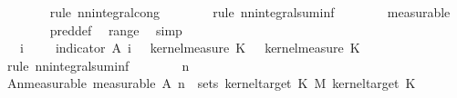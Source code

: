 \begin{isabellebody}
\ \ \ \ \ \ \isamarkupfalse%
\ {\isacharparenleft}{\kern0pt}rule\ nn{\isacharunderscore}{\kern0pt}integral{\isacharunderscore}{\kern0pt}cong{\isacharparenright}{\kern0pt}\isanewline
\ \ \ \ \ \ \isamarkupfalse%
\ {\isacharparenleft}{\kern0pt}rule\ nn{\isacharunderscore}{\kern0pt}integral{\isacharunderscore}{\kern0pt}suminf{\isacharparenright}{\kern0pt}\isanewline
\ \ \ \ \ \ \isamarkupfalse%
\ measurable\isanewline
\ \ \ \ \ \ \isamarkupfalse%
\ pred{\isacharunderscore}{\kern0pt}def\ \isamarkupfalse%
\ range\ \isamarkupfalse%
\ simp\isanewline
\ \ \ \ \ \ \isamarkupfalse%
\isanewline
\ \ \ \ \isamarkupfalse%
\ \isamarkupfalse%
\ {\isachardoublequoteopen}{\isachardot}{\kern0pt}{\isachardot}{\kern0pt}{\isachardot}{\kern0pt}\ {\isacharequal}{\kern0pt}\ {\isacharparenleft}{\kern0pt}{\isasymSum}i{\isachardot}{\kern0pt}\ {\isasymintegral}\isactrlsup {\isacharplus}{\kern0pt}\ {\isasymomega}\ {\isasymintegral}\isactrlsup {\isacharplus}{\kern0pt}\ {\isasymomega}\ indicator\ {\isacharparenleft}{\kern0pt}A\ i{\isacharparenright}{\kern0pt}\ {\isacharparenleft}{\kern0pt}{\isasymomega}\ {\isasymomega}\ {\isasympartial}kernel{\isacharunderscore}{\kern0pt}measure\ K{\isacharunderscore}{\kern0pt}{}\ {\isacharparenleft}{\kern0pt}{\isasymomega}\ {\isasymomega}\ {\isasympartial}kernel{\isacharunderscore}{\kern0pt}measure\ K{\isacharunderscore}{\kern0pt}{}\ {\isasymomega}\isanewline
\ \ \ \ \isamarkupfalse%
\ {\isacharparenleft}{\kern0pt}rule\ nn{\isacharunderscore}{\kern0pt}integral{\isacharunderscore}{\kern0pt}suminf{\isacharparenright}{\kern0pt}\isanewline
\ \ \ \ \ \ \isamarkupfalse%
\ n\isanewline
\ \ \ \ \ \ \isamarkupfalse%
\ A{\isacharunderscore}{\kern0pt}n{\isacharunderscore}{\kern0pt}measurable\ {\isacharbrackleft}{\kern0pt}measurable{\isacharbrackright}{\kern0pt}{\isacharcolon}{\kern0pt}\ {\isachardoublequoteopen}A\ n\ {\isasymin}\ sets\ {\isacharparenleft}{\kern0pt}kernel{\isacharunderscore}{\kern0pt}target\ K{\isacharunderscore}{\kern0pt}{}\ {\isasymOtimes}\isactrlsub M\ kernel{\isacharunderscore}{\kern0pt}target\ K{\isacharunderscore}{\kern0pt}{}{\isacharparenright}{\kern0pt}{\isachardoublequoteclose}\isanewline

\end{isabellebody}
